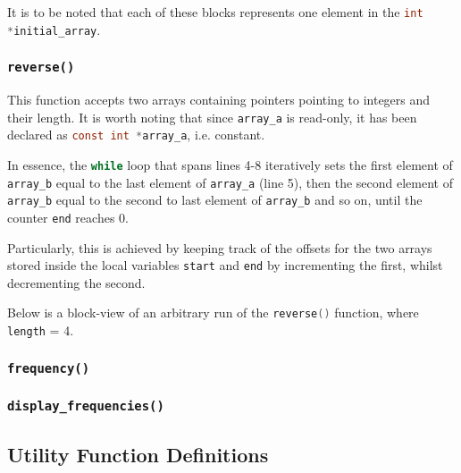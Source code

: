 \documentclass{article}
\newcommand{\code}[1]{\lstinline[language=C]!#1!}
\begin{document}
It is to be noted that each of these blocks represents one element in the \code{int *initial_array}.

\newpage

\subsubsection{\texttt{reverse()}}



This function accepts two arrays containing pointers pointing to integers and their length. It is
worth noting that since \code{array_a} is read-only, it has been declared as \code{const int
*array_a}, i.e. constant.

In essence, the \code{while} loop that spans lines 4-8 iteratively sets the first element of
\code{array_b} equal to the last element of \code{array_a} (line 5), then the second element of
\code{array_b} equal to the second to last element of \code{array_b} and so on, until the counter
\code{end} reaches 0. 

Particularly, this is achieved by keeping track of the offsets for the two arrays stored inside the
local variables \code{start} and \code{end} by incrementing the first, whilst decrementing the
second.

Below is a block-view of an arbitrary run of the \code{reverse()} function, where \code{length} = 4.



\newpage

\subsubsection{\texttt{frequency()}}



\newpage

\subsubsection{\texttt{display\_frequencies()}}



\newpage

\subsection{Utility Function Definitions}
\end{document}
